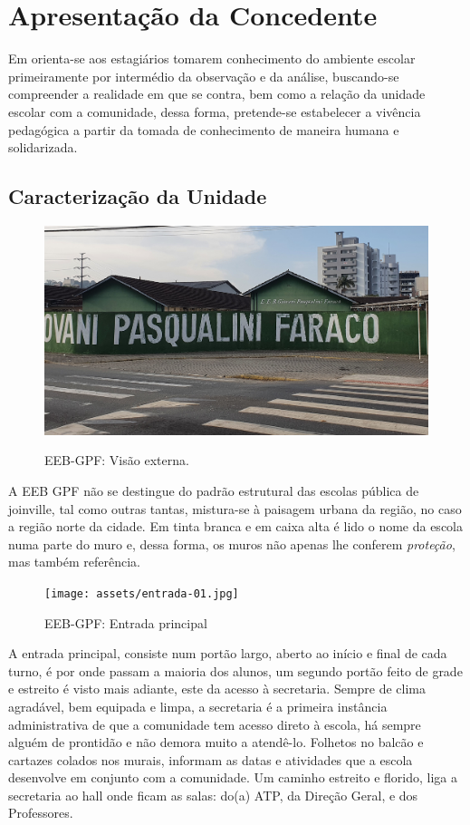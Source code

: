 \chapter{Apresentação da Concedente} %
\label{chap:Apresentação da Concedente}
Em \cite{CARVALHO:2012} orienta-se aos estagiários tomarem conhecimento do ambiente escolar primeiramente por intermédio da observação e da análise, buscando-se compreender a realidade em que se contra, bem como a relação da unidade escolar com a comunidade, dessa forma, pretende-se estabelecer a vivência pedagógica a partir da tomada de conhecimento de maneira humana e solidarizada.

\section{Caracterização da Unidade} %
\label{sec:Caracterização da Unidade}
\setlength\intextsep{0pt}
\begin{figure}
	\centering
	\includegraphics[width=.45\textwidth]{assets/vista-ext01.jpg}
	\label{fig:vista-externa}
	\caption{EEB-GPF: Visão externa.}
\end{figure}
A \ac{EEB} \ac{GPF} não se destingue do padrão estrutural das escolas pública de joinville, tal como outras tantas, mistura-se à paisagem urbana da região, no caso a região norte da cidade. Em tinta branca e em caixa alta é lido o nome da escola numa parte do muro e, dessa forma, os muros não apenas lhe conferem \emph{proteção}, mas também referência.

\setlength\intextsep{0pt}
\begin{figure}
	\centering
	\texttt{[image: assets/entrada-01.jpg]}
	\label{fig:entr-principal}
	\caption{EEB-GPF: Entrada principal}
\end{figure} A entrada principal, consiste num portão largo, aberto ao início e final de cada turno, é por onde passam a maioria dos alunos, um segundo portão feito de grade e estreito é visto mais adiante, este da acesso à secretaria. Sempre de clima agradável, bem equipada e limpa, a secretaria é a primeira instância administrativa de que a comunidade tem acesso direto à escola, há sempre alguém de prontidão e não demora muito a atendê-lo. Folhetos no balcão e cartazes colados nos murais, informam as datas e atividades que a escola desenvolve em conjunto com a comunidade. Um caminho estreito e florido, liga a secretaria ao hall onde ficam as salas: do(a) \ac{ATP}, da Direção Geral, e dos Professores.

